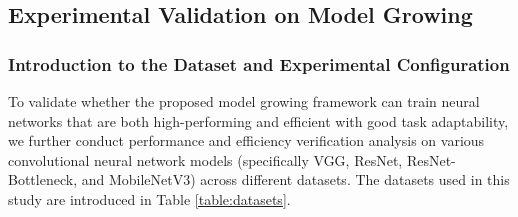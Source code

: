 \documentclass[preprint,12pt]{elsarticle}
\begin{document}
\subsection{Experimental Validation on Model Growing}

\subsubsection{Introduction to the Dataset and Experimental Configuration}

To validate whether the proposed model growing framework can train neural networks that are both high-performing and efficient with good task adaptability, we further conduct performance and efficiency verification analysis on various convolutional neural network models (specifically VGG, ResNet, ResNet-Bottleneck, and MobileNetV3) across different datasets. The datasets used in this study are introduced in Table \ref{table:datasets}.
\end{document}
